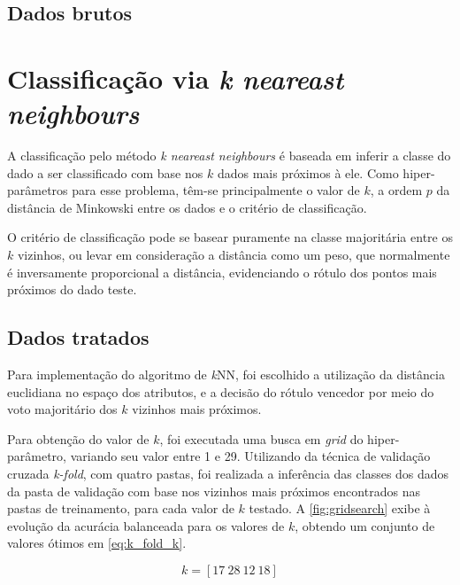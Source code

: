 \subsection{Dados brutos}







\clearpage
\section{Classificação via \textit{k neareast neighbours}}

A classificação pelo método \textit{k neareast neighbours} é baseada em inferir a classe do dado a ser classificado com base nos $k$ dados mais próximos à ele. Como hiper-parâmetros para esse problema, têm-se principalmente o valor de $k$, a ordem $p$ da distância de Minkowski entre os dados e o critério de classificação.

O critério de classificação pode se basear puramente na classe majoritária entre os $k$ vizinhos, ou levar em consideração a distância como um peso, que normalmente é inversamente proporcional a distância, evidenciando o rótulo dos pontos mais próximos do dado teste.


\subsection{Dados tratados}

Para implementação do algoritmo de \textit{k}NN, foi escolhido a utilização da distância euclidiana no espaço dos atributos, e a decisão do rótulo vencedor por meio do voto majoritário dos $k$ vizinhos mais próximos.

Para obtenção do valor de $k$, foi executada uma busca em \textit{grid} do hiper-parâmetro, variando seu valor entre 1 e 29. Utilizando da técnica de validação cruzada \textit{k-fold}, com quatro pastas, foi realizada a inferência das classes dos dados da pasta de validação com base nos vizinhos mais próximos encontrados nas pastas de treinamento, para cada valor de $k$ testado. A \autoref{fig:gridsearch} exibe à evolução da acurácia balanceada para os valores de $k$, obtendo um conjunto de valores ótimos em \eqref{eq:k_fold_k}.

\begin{equation}\label{eq:k_fold_k}
	k = [17\ 28\ 12\ 18]
\end{equation}


